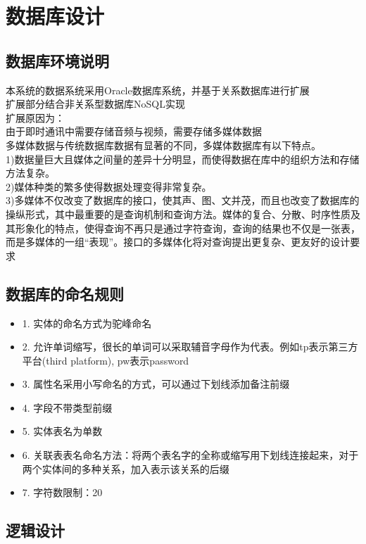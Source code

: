\chapter{\color{red} 数据库设计}
\section{数据库环境说明}
本系统的数据系统采用Oracle数据库系统，并基于关系数据库进行扩展\\
扩展部分结合非关系型数据库NoSQL实现\\
扩展原因为：\\
由于即时通讯中需要存储音频与视频，需要存储多媒体数据\\
多媒体数据与传统数据库数据有显著的不同，多媒体数据库有以下特点。\\
1)数据量巨大且媒体之间量的差异十分明显，而使得数据在库中的组织方法和存储方法复杂。\\
2)媒体种类的繁多使得数据处理变得非常复杂。\\
3)多媒体不仅改变了数据库的接口，使其声、图、文并茂，而且也改变了数据库的操纵形式，其中最重要的是查询机制和查询方法。媒体的复合、分散、时序性质及其形象化的特点，使得查询不再只是通过字符查询，查询的结果也不仅是一张表，而是多媒体的一组“表现”。接口的多媒体化将对查询提出更复杂、更友好的设计要求



\section{数据库的命名规则}
\begin{itemize}
    \item 1. 实体的命名方式为驼峰命名
    \item 2. 允许单词缩写，很长的单词可以采取辅音字母作为代表。例如tp表示第三方平台(third platform), pw表示password
    \item 3. 属性名采用小写命名的方式，可以通过下划线添加备注前缀
    \item 4. 字段不带类型前缀
    \item 5. 实体表名为单数
    \item 6. 关联表表名命名方法：将两个表名字的全称或缩写用下划线连接起来，对于两个实体间的多种关系，加入表示该关系的后缀
    \item 7. 字符数限制：20
\end{itemize}

\section{\color{red}逻辑设计}

